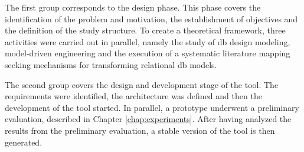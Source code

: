 The first group corresponds to the design phase.
This phase covers the identification of the problem and motivation, the establishment of objectives and the definition of the study structure.
To create a theoretical framework, three activities were carried out in parallel, namely the study of \ac{db} design modeling, model-driven engineering and the execution of a systematic literature mapping seeking mechanisms for transforming relational \ac{db} models.

The second group covers the design and development stage of the tool.
The requirements were identified, the architecture was defined and then the development of the tool started.
In parallel, a prototype underwent a preliminary evaluation, described in Chapter \ref{chap:experiments}.
After having analyzed the results from the preliminary evaluation, a stable version of the tool is then generated.


